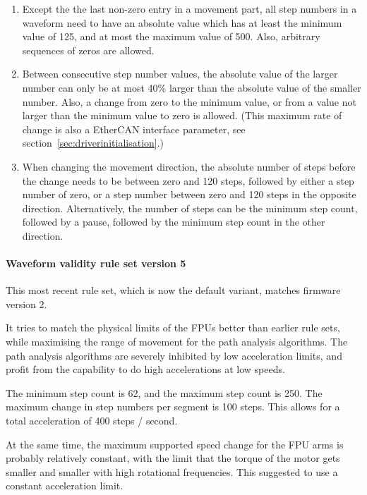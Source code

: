 \documentclass[fontsize=12,a4paper]{scrreprt}
\begin{document}
\begin{enumerate}
\item Except the the last non-zero entry in a movement part, all step
  numbers in a waveform need to have an absolute value which has at
  least the minimum value of 125, and at most the maximum value of
  500. Also, arbitrary sequences of zeros are allowed.

\item Between consecutive step number values, the absolute value of
  the larger number can only be at most 40\% larger than the absolute
  value of the smaller number. Also, a change from zero to the minimum
  value, or from a value not larger than the minimum value to zero is
  allowed. (This maximum rate of change is also a EtherCAN interface parameter, see
  section~\ref{sec:driverinitialisation}.)

\item When changing the movement direction, the absolute number of
  steps before the change needs to be between zero and 120 steps,
  followed by either a step number of zero, or a step number between
  zero and 120 steps in the opposite direction. Alternatively, the
  number of steps can be the minimum step count, followed by a pause,
  followed by the minimum step count in the other direction.


\end{enumerate}

\paragraph{Waveform validity rule set version 5}

This most recent rule set, which is now the default variant,
matches firmware version 2.

It tries to match the physical limits of the FPUs better than earlier
rule sets, while maximising the range of movement for the path
analysis algorithms. The path analysis algorithms are severely
inhibited by low acceleration limits, and profit from the capability
to do high accelerations at low speeds.

The minimum step count is 62, and the maximum step count is 250.  The
maximum change in step numbers per segment is 100 steps. This allows
for a total acceleration of 400 steps / second.

At the same time, the maximum supported speed change for the FPU
arms is probably relatively constant, with the limit that
the torque of the motor gets smaller and smaller with
high rotational frequencies. This suggested to use a constant
acceleration limit.
\end{document}
